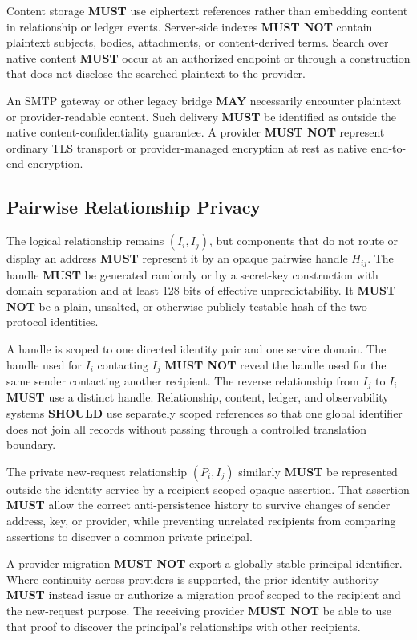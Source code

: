 \documentclass[11pt]{article}
\newcommand{\MUST}{\textbf{MUST}}
\newcommand{\MUSTNOT}{\textbf{MUST NOT}}
\newcommand{\SHOULD}{\textbf{SHOULD}}
\newcommand{\MAY}{\textbf{MAY}}
\begin{document}
Content storage \MUST{} use ciphertext references rather than embedding content
in relationship or ledger events. Server-side indexes \MUSTNOT{} contain plaintext
subjects, bodies, attachments, or content-derived terms. Search over native
content \MUST{} occur at an authorized endpoint or through a construction that
does not disclose the searched plaintext to the provider.

An SMTP gateway or other legacy bridge \MAY{} necessarily encounter plaintext or
provider-readable content. Such delivery \MUST{} be identified as outside the
native content-confidentiality guarantee. A provider \MUSTNOT{} represent ordinary
TLS transport or provider-managed encryption at rest as native end-to-end
encryption.

\subsection{Pairwise Relationship Privacy}

The logical relationship remains $(I_i,I_j)$, but components that do not route or
display an address \MUST{} represent it by an opaque pairwise handle $H_{ij}$. The
handle \MUST{} be generated randomly or by a secret-key construction with domain
separation and at least 128 bits of effective unpredictability. It \MUSTNOT{} be a
plain, unsalted, or otherwise publicly testable hash of the two protocol
identities.

A handle is scoped to one directed identity pair and one service domain. The
handle used for $I_i$ contacting $I_j$ \MUSTNOT{} reveal the handle used for the
same sender contacting another recipient. The reverse relationship from $I_j$ to
$I_i$ \MUST{} use a distinct handle. Relationship, content, ledger, and
observability systems \SHOULD{} use separately scoped references so that one
global identifier does not join all records without passing through a controlled
translation boundary.

The private new-request relationship $(P_i,I_j)$ similarly \MUST{} be
represented outside the identity service by a recipient-scoped opaque assertion.
That assertion \MUST{} allow the correct anti-persistence history to survive changes
of sender address, key, or provider, while preventing unrelated recipients from
comparing assertions to discover a common private principal.

A provider migration \MUSTNOT{} export a globally stable principal identifier.
Where continuity across providers is supported, the prior identity authority
\MUST{} instead issue or authorize a migration proof scoped to the recipient and
the new-request purpose. The receiving provider \MUSTNOT{} be able to use
that proof to discover the principal's relationships with other recipients.
\end{document}
